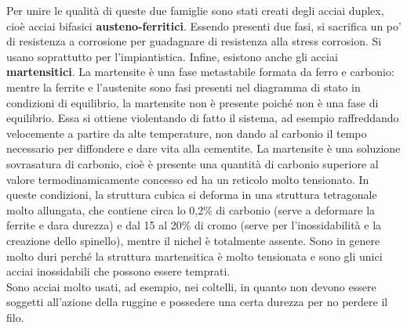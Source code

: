 Per unire le qualità di queste due famiglie sono stati creati degli acciai duplex, cioè acciai bifasici \textbf{austeno-ferritici}. Essendo presenti due fasi, si sacrifica un po’ di resistenza a corrosione per guadagnare di resistenza alla stress corrosion. Si usano soprattutto per l’impiantistica.
Infine, esistono anche gli acciai \textbf{martensitici}. La martensite è una fase metastabile formata da ferro e carbonio: mentre la ferrite e l’austenite sono fasi presenti nel diagramma di stato in condizioni di equilibrio, la martensite non è presente poiché non è una fase di equilibrio. Essa si ottiene violentando di fatto il sistema, ad esempio raffreddando velocemente a partire da alte temperature, non dando al carbonio il tempo necessario per diffondere e dare vita alla cementite.
La martensite è una soluzione sovrasatura di carbonio, cioè è presente una quantità di carbonio superiore al valore termodinamicamente concesso ed ha un reticolo molto tensionato. In queste condizioni, la struttura cubica si deforma in una struttura tetragonale molto allungata, che contiene circa lo 0,2\% di carbonio (serve a deformare la ferrite e dara durezza) e dal 15 al 20\% di cromo (serve per l’inossidabilità e la creazione dello spinello), mentre il nichel è totalmente assente. Sono in genere molto duri perché la struttura martensitica è molto tensionata e sono gli unici acciai inossidabili che possono essere temprati.\\
Sono acciai molto usati, ad esempio, nei coltelli, in quanto non devono essere soggetti all’azione della ruggine e possedere una certa durezza per no perdere il filo. 

